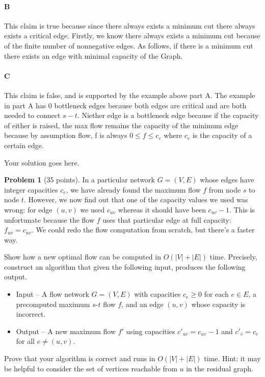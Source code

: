\documentclass[10pt]{article}
\theoremstyle{definition}
\newcommand{\solution}[1]{\medskip\noindent{\color{cit}\textbf{Solution:} #1}}
\newtheorem{problem}{\sc\color{cit}Problem}
\begin{document}
{\paragraph{B} This claim is true because since there always exists a minimum cut there always exists a critical edge. Firstly, we know there 
always exists a minimum cut because of the finite number of nonnegative edges. As follows, if there is a minimum cut there exists an edge 
with minimal capacity of the Graph. 

\paragraph{C} This claim is false, and is supported by the example above part A. The example in part A has 0 bottleneck edges because both 
edges are critical and are both needed to connect $s-t$. Niether edge is a bottleneck edge because if the capacity of either is raised, the
max flow remains the capacity of the minimum edge because by assumption flow, f is always $0 \leq f \leq c_e$ where $c_e$ is the capacity of a 
certain edge. 








  Your solution goes here.
}


\newpage
\medskip{}

\newpage
\begin{problem}[35 points]
In a particular network $G=(V,E)$ whose edges have integer capacities $c_e$, we have already found the maximum flow $f$ from node $s$ to node $t$. However, we now find out that one of the capacity values we used was wrong: for edge $(u, v)$ we used $c_{uv}$ whereas it should have been $c_{uv} - 1$. This is unfortunate because the flow $f$ uses that particular edge at full capacity: $f_{uv} = c_{uv}$. We could redo the flow computation from scratch, but there's a faster way.

Show how a new optimal flow can be computed in $O(\lvert V \rvert + \lvert E \rvert)$ time. Precisely, construct an algorithm that given the following input, produces the following output.
\begin{itemize}
\item Input -- A flow network $G = (V, E)$ with capacities $c_e \geq 0$ for each $e \in E$, a precomputed maximum $s$-$t$ flow $f$, and an edge $(u, v)$ whose capacity is incorrect. 

\item Output -- A new maximum flow $f'$ using capacities $c'_{uv} = c_{uv} - 1$ and  $c'_e = c_e$ for all $e \neq (u,v)$.
\end{itemize}

Prove that your algorithm is correct and runs in $O( \lvert V \rvert + \lvert E \rvert)$ time. Hint: it may be helpful to consider the set of vertices reachable from $u$ in the residual graph.
\end{problem}

\solution{
  Your solution goes here.
}

\newpage
\medskip{}
\end{document}
